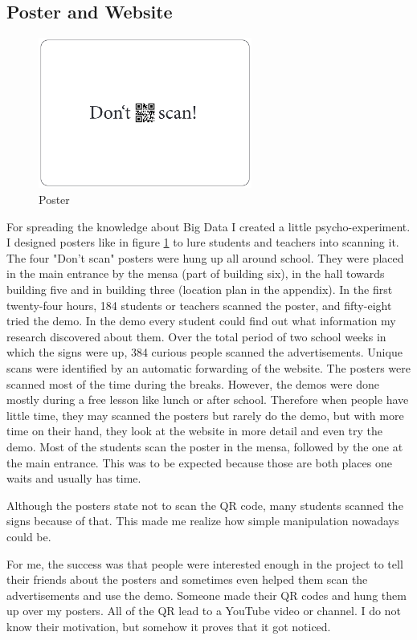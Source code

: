 \documentclass[paper=a4, fontsize=11pt]{article}
\begin{document}
\subsection{Poster and Website}
\begin{figure}
\centering
\includegraphics [width = 7cm]{images/posternice.png}
\caption{Poster\label{poster}}
\end{figure}
For spreading the knowledge about Big Data I created a little psycho-experiment. I designed posters like in figure \ref{poster} to lure students and teachers into scanning it.
The four "Don't scan" posters were hung up all around school. They were placed in the main entrance by the mensa (part of building six), in the hall towards building five and in building three (location plan in the appendix). In the first twenty-four hours, 184 students or teachers scanned the poster, and fifty-eight tried the demo. In the demo every student could find out what information my research discovered about them. Over the total period of two school weeks in which the signs were up, 384 curious people scanned the advertisements. Unique scans were identified by an automatic forwarding of the website. The posters were scanned most of the time during the breaks. However, the demos were done mostly during a free lesson like lunch or after school. Therefore when people have little time, they may scanned the posters but rarely do the demo, but with more time on their hand, they look at the website in more detail and even try the demo. Most of the students scan the poster in the mensa, followed by the one at the main entrance. This was to be expected because those are both places one waits and usually has time.




Although the posters state not to scan the QR code, many students scanned the signs because of that. This made me realize how simple manipulation nowadays could be.

For me, the success was that people were interested enough in the project to tell their friends about the posters and sometimes even helped them scan the advertisements and use the demo. Someone made their QR codes and hung them up over my posters. All of the QR lead to a YouTube video or channel. I do not know their motivation, but somehow it proves that it got noticed.
\end{document}

